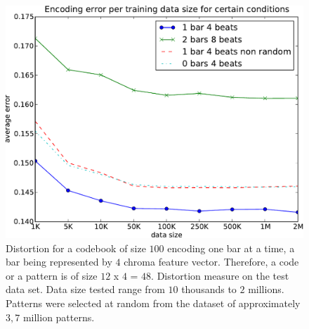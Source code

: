 \documentclass{article}
\begin{document}
\begin{figure}[htb]
\begin{center}
\includegraphics[width=.99\columnwidth]{data_sizes}
\end{center}
\caption{{Distortion for a codebook of size $100$ encoding one bar
at a time, a bar being represented by $4$ chroma feature vector.
Therefore, a code or a pattern is of size $12$ x $4$ = $48$.
Distortion measure on the test data set. Data size tested range
from $10$ thousands to $2$ millions. Patterns were selected at
random from the dataset of approximately $3,7$ million patterns.}}
\label{fig:sizes}
\end{figure}
\end{document}
